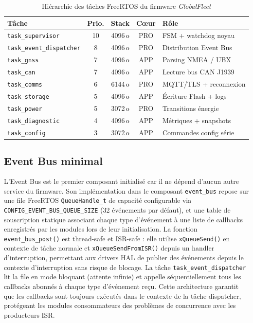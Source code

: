 \begin{table}[H]
\centering
\renewcommand{\arraystretch}{1.6}
\caption{Hiérarchie des tâches FreeRTOS du firmware \textit{GlobalFleet}}
\label{tab:tasks}
\small
\begin{tabular}{|p{3.8cm}|c|c|c|p{3.2cm}|}
\hline
\rowcolor{gray!20}
\textbf{Tâche} & \textbf{Prio.} & \textbf{Stack} & \textbf{Cœur} & \textbf{Rôle} \\
\hline
\texttt{task\_supervisor}        & 10 & 4096\,o & PRO & FSM + watchdog noyau \\
\hline
\texttt{task\_event\_dispatcher} & 8  & 4096\,o & PRO & Distribution Event Bus \\
\hline
\texttt{task\_gnss}              & 7  & 4096\,o & APP & Parsing NMEA / UBX \\
\hline
\texttt{task\_can}               & 7  & 4096\,o & APP & Lecture bus CAN J1939 \\
\hline
\texttt{task\_comms}             & 6  & 6144\,o & PRO & MQTT/TLS + reconnexion \\
\hline
\texttt{task\_storage}           & 5  & 4096\,o & APP & Écriture Flash + logs \\
\hline
\texttt{task\_power}             & 5  & 3072\,o & PRO & Transitions énergie \\
\hline
\texttt{task\_diagnostic}        & 4  & 4096\,o & APP & Métriques + snapshots \\
\hline
\texttt{task\_config}            & 3  & 3072\,o & APP & Commandes config série \\
\hline
\end{tabular}
\end{table}

\subsection{Event Bus minimal}
\label{subsec:evtbus_impl}

L'Event Bus est le premier composant initialisé car il ne dépend
d'aucun autre service du firmware. Son implémentation dans le composant
\texttt{event\_bus} repose sur une file FreeRTOS
\texttt{QueueHandle\_t} de capacité configurable via
\texttt{CONFIG\_EVENT\_BUS\_QUEUE\_SIZE} (32 événements par défaut),
et une table de souscription statique associant chaque type d'événement
à une liste de callbacks enregistrés par les modules lors de leur
initialisation. La fonction \texttt{event\_bus\_post()} est
thread-safe et ISR-safe : elle utilise \texttt{xQueueSend()} en
contexte de tâche normale et \texttt{xQueueSendFromISR()} depuis
un handler d'interruption, permettant aux drivers HAL de publier
des événements depuis le contexte d'interruption sans risque de
blocage. La tâche \texttt{task\_event\_dispatcher} lit la file en
mode bloquant (attente infinie) et appelle séquentiellement tous
les callbacks abonnés à chaque type d'événement reçu. Cette
architecture garantit que les callbacks sont toujours exécutés
dans le contexte de la tâche dispatcher, protégeant les modules
consommateurs des problèmes de concurrence avec les producteurs
ISR.


